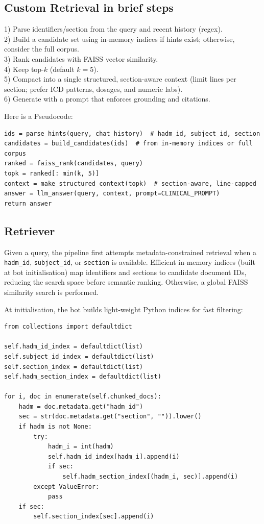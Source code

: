 \subsection{Custom Retrieval in brief steps}
1) Parse identifiers/section from the query and recent history (regex).\\
2) Build a candidate set using in-memory indices if hints exist; otherwise, consider the full corpus.\\
3) Rank candidates with FAISS vector similarity.\\
4) Keep top-\(k\) (default \(k=5\)).\\
5) Compact into a single structured, section-aware context (limit lines per section; prefer ICD patterns, dosages, and numeric labs).\\
6) Generate with a prompt that enforces grounding and citations.

\noindent Here is a Pseudocode:
\begin{verbatim}
ids = parse_hints(query, chat_history)  # hadm_id, subject_id, section
candidates = build_candidates(ids)  # from in-memory indices or full corpus
ranked = faiss_rank(candidates, query)
topk = ranked[: min(k, 5)]
context = make_structured_context(topk)  # section-aware, line-capped
answer = llm_answer(query, context, prompt=CLINICAL_PROMPT)
return answer
\end{verbatim}

\subsection{Retriever}
Given a query, the pipeline first attempts metadata-constrained retrieval when a \texttt{hadm\_id}, \texttt{subject\_id}, or \texttt{section} is available. Efficient in-memory indices (built at bot initialisation) map identifiers and sections to candidate document IDs, reducing the search space before semantic ranking. Otherwise, a global FAISS similarity search is performed.

\smallskip
\noindent At initialisation, the bot builds light-weight Python indices for fast filtering:
\begin{verbatim}
from collections import defaultdict

self.hadm_id_index = defaultdict(list)
self.subject_id_index = defaultdict(list)
self.section_index = defaultdict(list)
self.hadm_section_index = defaultdict(list)

for i, doc in enumerate(self.chunked_docs):
    hadm = doc.metadata.get("hadm_id")
    sec = str(doc.metadata.get("section", "")).lower()
    if hadm is not None:
        try:
            hadm_i = int(hadm)
            self.hadm_id_index[hadm_i].append(i)
            if sec:
                self.hadm_section_index[(hadm_i, sec)].append(i)
        except ValueError:
            pass
    if sec:
        self.section_index[sec].append(i)
\end{verbatim}


